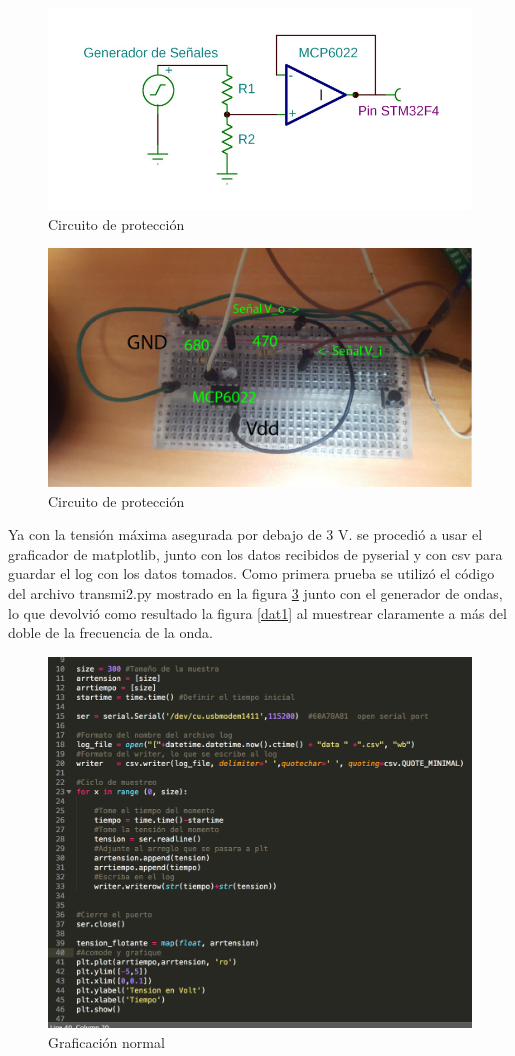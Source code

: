 \documentclass[letterpaper]{article}
\begin{document}
\begin{figure}[hbtp]
\centering
\includegraphics[width=8 cm]{circ1.png}
\caption{Circuito de protección}
\label{circ1}
\end{figure}
\begin{figure}[hbtp]
\centering
\includegraphics[width=8 cm]{circr.png}
\caption{Circuito de protección}
\label{circ2}
\end{figure}

\newpage

Ya con la tensión máxima asegurada por debajo de 3 V. se procedió a usar el graficador de matplotlib, junto con los datos recibidos de pyserial y con csv para guardar el log con los datos tomados. Como primera prueba se utilizó el código del archivo transmi2.py mostrado en la figura  \ref{t2} junto con el generador de ondas, lo que devolvió como resultado la figura  \ref{dat1} al muestrear claramente a más del doble de la frecuencia de la onda. 

\begin{figure}[hbtp]
\centering
\includegraphics[width=12 cm]{normal.png}
\caption{Graficación normal}
\label{t2}
\end{figure}
\end{document}
